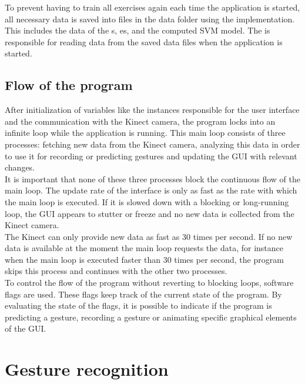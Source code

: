 To prevent having to train all exercises again each time the application is started, all necessary data is saved into files in the data folder using the  implementation. This includes the data of the s, es,  and the computed SVM model. The  is responsible for reading data from the saved data files when the application is started.\\


\subsection{Flow of the program}

After initialization of variables like the instances responsible for the user interface and the communication with the Kinect camera, the program locks into an infinite loop while the application is running. This main loop consists of three processes: fetching new data from the Kinect camera, analyzing this data in order to use it for recording or predicting gestures and updating the GUI with relevant changes.\\

It is important that none of these three processes block the continuous flow of the main loop. The update rate of the interface is only as fast as the rate with which the main loop is executed. If it is slowed down with a blocking or long-running loop, the GUI appears to stutter or freeze and no new data is collected from the Kinect camera.\\

The Kinect can only provide new data as fast as 30 times per second. If no new data is available at the moment the main loop requests the data, for instance when the main loop is executed faster than 30 times per second, the program skips this process and continues with the other two processes.\\

To control the flow of the program without reverting to blocking loops, software flags are used. These flags keep track of the current state of the program. By evaluating the state of the flags, it is possible to indicate if the program is predicting a gesture, recording a gesture or animating specific graphical elements of the GUI.


\section{Gesture recognition}

